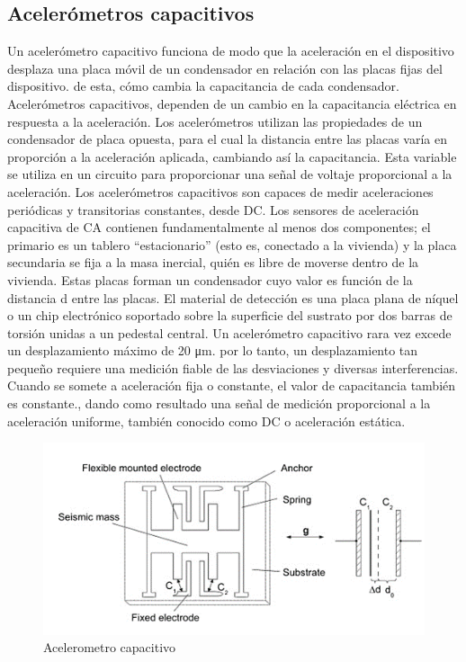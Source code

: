 \subsection{Acelerómetros capacitivos}

Un acelerómetro capacitivo funciona de modo que la aceleración en el dispositivo desplaza una placa móvil de un condensador en relación con las placas fijas del dispositivo. de esta, cómo cambia la capacitancia de cada condensador.
Acelerómetros capacitivos, dependen de un cambio en la capacitancia eléctrica en respuesta a la aceleración. Los acelerómetros utilizan las propiedades de un condensador de placa opuesta, para el cual la distancia entre las placas varía en proporción a la aceleración aplicada, cambiando así la capacitancia. Esta variable se utiliza en un circuito para proporcionar una señal de voltaje proporcional a la aceleración.
Los acelerómetros capacitivos son capaces de medir aceleraciones periódicas y transitorias constantes, desde DC. Los sensores de aceleración capacitiva de CA contienen fundamentalmente al menos dos componentes; el primario es un tablero “estacionario” (esto es, conectado a la vivienda) y la placa secundaria se fija a la masa inercial, quién es libre de moverse dentro de la vivienda. Estas placas forman un condensador cuyo valor es función de la distancia d entre las placas. El material de detección es una placa plana de níquel o un chip electrónico soportado sobre la superficie del sustrato por dos barras de torsión unidas a un pedestal central. Un acelerómetro capacitivo rara vez excede un desplazamiento máximo de 20 μm. por lo tanto, un desplazamiento tan pequeño requiere una medición fiable de las desviaciones y diversas interferencias. Cuando se somete a aceleración fija o constante, el valor de capacitancia también es constante., dando como resultado una señal de medición proporcional a la aceleración uniforme, también conocido como DC o aceleración estática.



\begin{figure}[h]
	\centering
	\includegraphics[width=0.7\linewidth]{img/acelerometro capacitivo.png}
	\caption{Acelerometro capacitivo}
	\label{fig:insertarimagen}
\end{figure}

